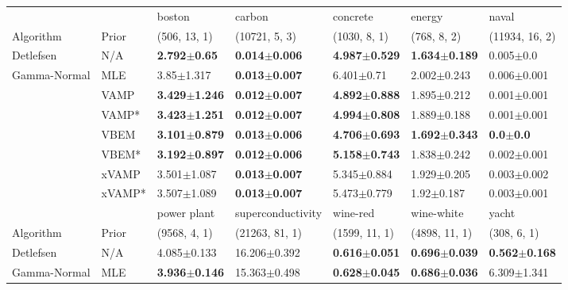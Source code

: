 \begin{tabular}{lllllll}
\toprule
             &        &                    boston &                    carbon &                  concrete &                    energy &                 naval \\
Algorithm & Prior& (506, 13, 1)& (10721, 5, 3)& (1030, 8, 1)& (768, 8, 2)& (11934, 16, 2)\\
\midrule
Detlefsen & N/A &   \textbf{2.792$\pm$0.65} &  \textbf{0.014$\pm$0.006} &  \textbf{4.987$\pm$0.529} &  \textbf{1.634$\pm$0.189} &         0.005$\pm$0.0 \\
Gamma-Normal & MLE &            3.85$\pm$1.317 &  \textbf{0.013$\pm$0.007} &            6.401$\pm$0.71 &           2.002$\pm$0.243 &       0.006$\pm$0.001 \\
             & VAMP &  \textbf{3.429$\pm$1.246} &  \textbf{0.012$\pm$0.007} &  \textbf{4.892$\pm$0.888} &           1.895$\pm$0.212 &       0.001$\pm$0.001 \\
             & VAMP* &  \textbf{3.423$\pm$1.251} &  \textbf{0.012$\pm$0.007} &  \textbf{4.994$\pm$0.808} &           1.889$\pm$0.188 &       0.001$\pm$0.001 \\
             & VBEM &  \textbf{3.101$\pm$0.879} &  \textbf{0.013$\pm$0.006} &  \textbf{4.706$\pm$0.693} &  \textbf{1.692$\pm$0.343} &  \textbf{0.0$\pm$0.0} \\
             & VBEM* &  \textbf{3.192$\pm$0.897} &  \textbf{0.012$\pm$0.006} &  \textbf{5.158$\pm$0.743} &           1.838$\pm$0.242 &       0.002$\pm$0.001 \\
             & xVAMP &           3.501$\pm$1.087 &  \textbf{0.013$\pm$0.007} &           5.345$\pm$0.884 &           1.929$\pm$0.205 &       0.003$\pm$0.002 \\
             & xVAMP* &           3.507$\pm$1.089 &  \textbf{0.013$\pm$0.007} &           5.473$\pm$0.779 &            1.92$\pm$0.187 &       0.003$\pm$0.001 \\
\midrule
             &        &               power plant &          superconductivity &                  wine-red &                wine-white &                     yacht \\
Algorithm & Prior& (9568, 4, 1)& (21263, 81, 1)& (1599, 11, 1)& (4898, 11, 1)& (308, 6, 1)\\
\midrule
Detlefsen & N/A &           4.085$\pm$0.133 &           16.206$\pm$0.392 &  \textbf{0.616$\pm$0.051} &  \textbf{0.696$\pm$0.039} &  \textbf{0.562$\pm$0.168} \\
Gamma-Normal & MLE &  \textbf{3.936$\pm$0.146} &           15.363$\pm$0.498 &  \textbf{0.628$\pm$0.045} &  \textbf{0.686$\pm$0.036} &           6.309$\pm$1.341 \\

\end{tabular}
